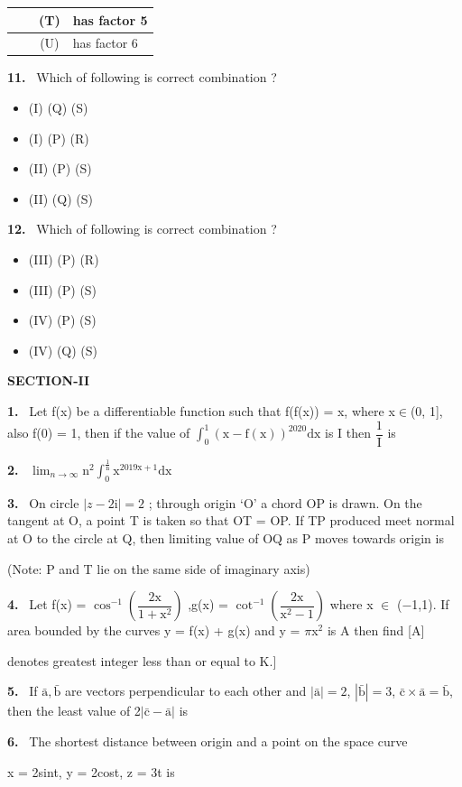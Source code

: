\documentclass[10pt]{extarticle}
\newcommand{\sect}[1]{\par\smallskip\noindent\textbf{#1}\par}
\newcommand{\qn}[1]{\par\smallskip\noindent\textbf{#1.}~}
\newenvironment{qoptions}{\begin{itemize}[leftmargin=1.8em,itemsep=1pt,topsep=2pt,label={}]}{\end{itemize}}
\newcommand{\opt}[2]{\item[(#1)] #2}
\begin{document}
\begin{multicols}{2}
{\begin{tabular}{|c|L{4.9cm}|c|L{1.9cm}|}
 & & (T) & has factor 5 \\ \hline
 & & (U) & has factor 6 \\ \hline
\end{tabular}}\par
\qn{11} Which of following is correct combination ?
\begin{qoptions}
\opt{A}{(I) (Q) (S)}
\opt{B}{(I) (P) (R)}
\opt{C}{(II) (P) (S)}
\opt{D}{(II) (Q) (S)}
\end{qoptions}
\qn{12} Which of following is correct combination ?
\begin{qoptions}
\opt{A}{(III) (P) (R)}
\opt{B}{(III) (P) (S)}
\opt{C}{(IV) (P) (S)}
\opt{D}{(IV) (Q) (S)}
\end{qoptions}
\sect{SECTION-II}
\qn{1} Let f(x) be a differentiable function such that f(f(x)) = x, where x$\in$(0, 1], also f(0) = 1, then if the value of $\displaystyle\int_0^1(\mathrm x-\mathrm f(\mathrm x))^{2020}\mathrm{dx}$ is I then $\dfrac1{\mathrm I}$ is
\qn{2} $\displaystyle\lim_{n\to\infty}\mathrm n^2\int_0^{\frac1{\mathrm n}}\mathrm x^{2019\mathrm x+1}\mathrm{dx}$
\qn{3} On circle $|z-2\mathrm i|=2$ ; through origin `O' a chord OP is drawn. On the tangent at O, a point T is taken so that OT = OP. If TP produced meet normal at O to the circle at Q, then limiting value of OQ as P moves towards origin is\underline{\hspace{1cm}}\par
(Note: P and T lie on the same side of imaginary axis)
\qn{4} Let f(x) = $\cos^{-1}\left(\dfrac{2\mathrm x}{1+\mathrm x^2}\right)$ ,g(x) = $\cot^{-1}\left(\dfrac{2\mathrm x}{\mathrm x^2-1}\right)$ where x $\in$ ($-$1,1). If area bounded by the curves y = f(x) + g(x) and y = $\pi$x$^2$ is A then find [A]\par
[Note: [K] denotes greatest integer less than or equal to K.]
\qn{5} If $\bar{\mathrm a},\bar{\mathrm b}$ are vectors perpendicular to each other and $|\bar{\mathrm a}|=2$, $|\bar{\mathrm b}|=3$, $\bar{\mathrm c}\times\bar{\mathrm a}=\bar{\mathrm b}$, then the least value of 2$|\bar{\mathrm c}-\bar{\mathrm a}|$ is
\qn{6} The shortest distance between origin and a point on the space curve\par
x = 2sint, y = 2cost, z = 3t is
\end{multicols}
\end{document}
